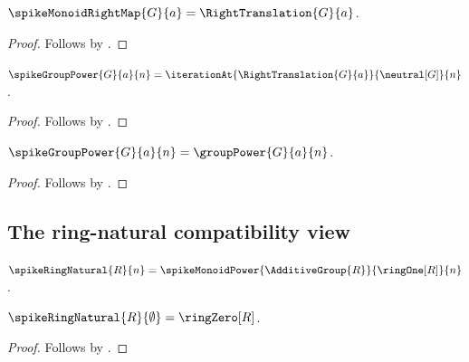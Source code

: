 \begin{proposition}\label{spike16_group_right_map_is_old_translation}
    $\spikeMonoidRightMap{G}{a}=\RightTranslation{G}{a}$.
\end{proposition}
\begin{proof}
    Follows by
        .
\end{proof}

\begin{theorem}\label{spike16_group_power_iteration_eq}
    $\spikeGroupPower{G}{a}{n}
        =\iterationAt{\RightTranslation{G}{a}}{\neutral[G]}{n}$.
\end{theorem}
\begin{proof}
    Follows by
        .
\end{proof}

\begin{theorem}\label{spike16_group_power_new_body_eq_old}
    $\spikeGroupPower{G}{a}{n}=\groupPower{G}{a}{n}$.
\end{theorem}
\begin{proof}
    Follows by
        .
\end{proof}

\subsection{The ring-natural compatibility view}

\begin{definition}\label{spike16_ring_natural_body}
    $\spikeRingNatural{R}{n}=
        \spikeMonoidPower{\AdditiveGroup{R}}{\ringOne[R]}{n}$.
\end{definition}

\begin{proposition}\label{spike16_ring_natural_zero}
    $\spikeRingNatural{R}{\emptyset}=\ringZero[R]$.
\end{proposition}
\begin{proof}
    Follows by
        .
\end{proof}

